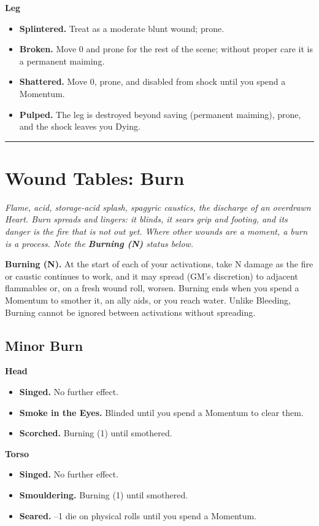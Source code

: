 \textbf{Leg}
\begin{itemize}
    \item[1] \textbf{Splintered.} Treat as a moderate blunt wound; prone.
    \item[2] \textbf{Broken.} Move 0 and prone for the rest of the scene; without proper care it is a permanent maiming.
    \item[3] \textbf{Shattered.} Move 0, prone, and disabled from shock until you spend a Momentum.
    \item[4] \textbf{Pulped.} The leg is destroyed beyond saving (permanent maiming), prone, and the shock leaves you Dying.
\end{itemize}

\medskip\hrule\medskip

\section{Wound Tables: Burn}

\textit{Flame, acid, storage-acid splash, spagyric caustics, the discharge of an overdrawn Heart. Burn spreads and lingers: it blinds, it sears grip and footing, and its danger is the fire that is not out yet. Where other wounds are a moment, a burn is a process. Note the \textbf{Burning (N)} status below.}

\textbf{Burning (N).} At the start of each of your activations, take N damage as the fire or caustic continues to work, and it may spread (GM's discretion) to adjacent flammables or, on a fresh wound roll, worsen. Burning ends when you spend a Momentum to smother it, an ally aids, or you reach water. Unlike Bleeding, Burning cannot be ignored between activations without spreading.

\subsection{Minor Burn}

\textbf{Head}
\begin{itemize}
    \item[1--2] \textbf{Singed.} No further effect.
    \item[3] \textbf{Smoke in the Eyes.} Blinded until you spend a Momentum to clear them.
    \item[4] \textbf{Scorched.} Burning (1) until smothered.
\end{itemize}

\textbf{Torso}
\begin{itemize}
    \item[1--2] \textbf{Singed.} No further effect.
    \item[3] \textbf{Smouldering.} Burning (1) until smothered.
    \item[4] \textbf{Seared.} --1 die on physical rolls until you spend a Momentum.
\end{itemize}

